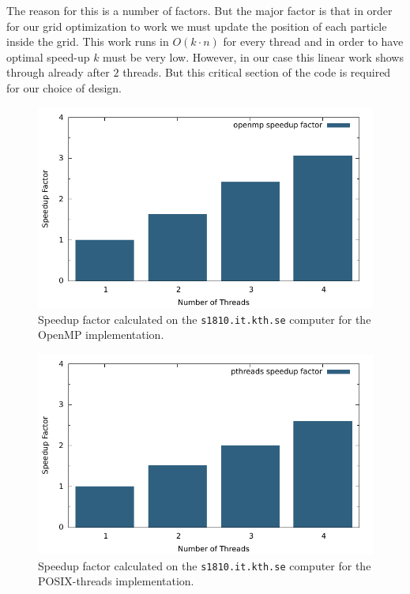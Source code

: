 The reason for this is a number of factors. But the major factor is that in
order for our grid optimization to work we must update the position of each
particle inside the grid. This work runs in $O(k \cdot n)$ for every thread and
in order to have optimal speed-up $k$ must be very low. However, in our case
this linear work shows through already after $2$ threads. But this critical
section of the code is required for our choice of design.

\begin{figure}[H]
	\includegraphics{plots/openmp_speedup.pdf}
	\caption{Speedup factor calculated on the \texttt{s1810.it.kth.se} computer for the OpenMP implementation.}
\end{figure}
\begin{figure}[H]
	\includegraphics{plots/pthreads_speedup.pdf}
	\caption{Speedup factor calculated on the \texttt{s1810.it.kth.se} computer for the POSIX-threads implementation.}
\end{figure}

